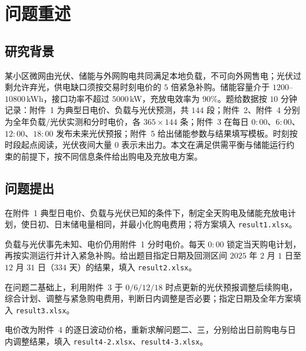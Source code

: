 \section{问题重述}

\subsection{研究背景}

某小区微网由光伏、储能与外网购电共同满足本地负载，不可向外网售电；光伏过剩允许弃光，供电缺口须按交易时刻电价的 $5$ 倍紧急补购。储能容量介于 $1200$--$10800$\,kWh，接口功率不超过 $5000$\,kW，充放电效率为 $90\%$。题给数据按 $10$ 分钟记录：附件~1 为典型日电价、负载与光伏预测，共 $144$ 段；附件~2、附件~4 分别为全年负载/光伏实测和分时电价，各 $365\times144$ 条；附件~3 在每日 $0{:}00$、$6{:}00$、$12{:}00$、$18{:}00$ 发布未来光伏预报；附件~5 给出储能参数与结果填写模板。时刻按时段起点阅读，光伏夜间大量 $0$ 表示未出力。本文在满足供需平衡与储能运行约束的前提下，按不同信息条件给出购电及充放电方案\cite{lasseter2002,katiraei2008}。

\subsection{问题提出}

在附件~1 典型日电价、负载与光伏已知的条件下，制定全天购电及储能充放电计划，使日初、日末储电量相同，并最小化购电费用；将方案填入 \texttt{result1.xlsx}。

负载与光伏事先未知、电价仍用附件~1 分时电价。每天 $0{:}00$ 锁定当天购电计划，再按实测运行并计入紧急补购。给出题目指定日期及回测区间 $2025$ 年 $2$ 月 $1$ 日至 $12$ 月 $31$ 日（$334$ 天）的结果，填入 \texttt{result2.xlsx}。

在问题二基础上，利用附件~3 于 $0/6/12/18$ 时点更新的光伏预报调整后续购电，综合计划、调整与紧急购电费用，判断日内调整是否必要；指定日期及全年方案填入 \texttt{result3.xlsx}。

电价改为附件~4 的逐日波动价格，重新求解问题二、三，分别给出日前购电与日内调整结果，填入 \texttt{result4-2.xlsx}、\texttt{result4-3.xlsx}。

